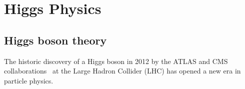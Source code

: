 \section{Higgs Physics}
\label{sec:physics}

\subsection{Higgs boson theory}

The historic discovery of a Higgs boson in 2012 by the ATLAS and CMS collaborations~\cite{atlas:2012obs,cms:2012obs}  at the Large Hadron Collider (LHC)  has opened a new era in particle physics.

\clearpage 

